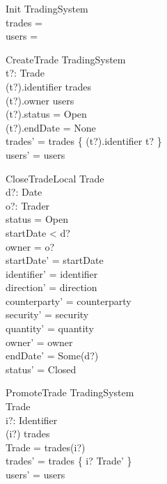 \documentclass{article}
\begin{document}
\begin{schema}{Init}
TradingSystem \\
\where
trades = \emptyset \\
users = \emptyset \\
\end{schema}
\vspace{-0.6cm} 
\begin{schema}{CreateTrade}
\Delta TradingSystem \\
t?: Trade \\
\where 
(t?).identifier \notin \dom trades \\
(t?).owner \in users \\
(t?).status = Open \\ 
(t?).endDate = None \\
trades' = trades \cup \{ (t?).identifier \mapsto t? \} \\
users' = users \\
\end{schema}
\vspace{-0.6cm} 
\begin{schema}{CloseTradeLocal}
\Delta Trade \\
d?: Date \\ 
o?: Trader \\
\where
status = Open \\ 
startDate < d? \\
owner = o? \\
startDate' = startDate \\
identifier' = identifier \\
direction' = direction \\
counterparty' = counterparty \\
security' = security \\
quantity' = quantity \\
owner' =  owner \\
endDate' = Some(d?) \\ 
status' = Closed \\
\end{schema}
\vspace{-0.6cm} 
\begin{schema}{PromoteTrade}
\Delta TradingSystem \\
\Delta Trade \\
i?: Identifier \\
\where
(i?) \in \dom trades \\
\theta Trade = trades(i?) \\
trades' = trades \oplus \{ i? \mapsto \theta Trade' \} \\
users' = users \\
\end{schema}
\end{document}
